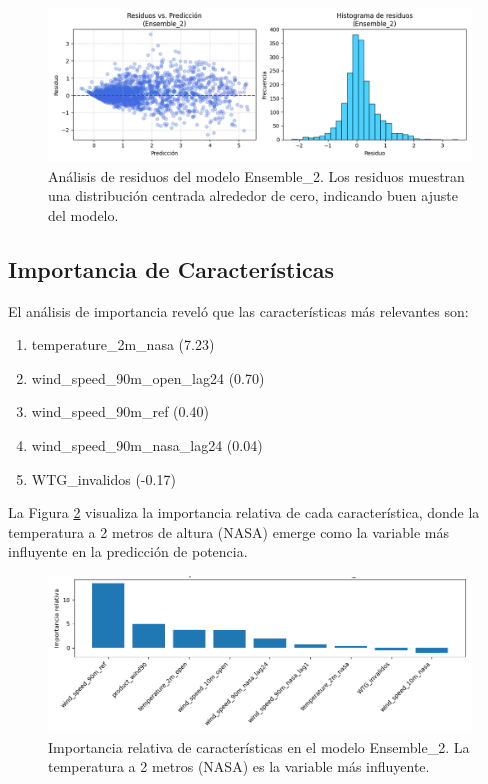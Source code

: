 \documentclass[conference]{IEEEtran}
\begin{document}
	\begin{figure}[htbp]
		\centering
		\includegraphics[width=0.9\linewidth]{images/Figure_3.png}
		\caption{Análisis de residuos del modelo Ensemble\_2. Los residuos muestran una distribución centrada alrededor de cero, indicando buen ajuste del modelo.}
		\label{fig:residuos_mejor_modelo}
	\end{figure}
	
	\subsection{Importancia de Características}
	El análisis de importancia reveló que las características más relevantes son:
	\begin{enumerate}
		\item temperature\_2m\_nasa (7.23)
		\item wind\_speed\_90m\_open\_lag24 (0.70)
		\item wind\_speed\_90m\_ref (0.40)
		\item wind\_speed\_90m\_nasa\_lag24 (0.04)
		\item WTG\_invalidos (-0.17)
	\end{enumerate}
	
	La Figura \ref{fig:importancia_caracteristicas} visualiza la importancia relativa de cada característica, donde la temperatura a 2 metros de altura (NASA) emerge como la variable más influyente en la predicción de potencia.
	
	\begin{figure}[htbp]
		\centering
		\includegraphics[width=0.9\linewidth]{images/Figure_6.png}
		\caption{Importancia relativa de características en el modelo Ensemble\_2. La temperatura a 2 metros (NASA) es la variable más influyente.}
		\label{fig:importancia_caracteristicas}
	\end{figure}
	
\end{document}
